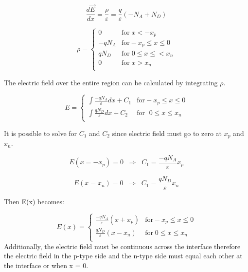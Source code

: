 \begin{doublespace}
\begin{equation}
\frac{d \vec{E} }{dx}=\frac{\rho}{\varepsilon}=\frac{q}{\varepsilon}(-N_{A}+N_{D})
\end{equation}

\begin{equation}
\rho = \begin{cases}
         0 & \text{for} \;  x<-x_{p}\\
       -qN_{A} & \text{for}  -x_{p}\leq x \leq 0 \\
        qN_{D} & \text{for} \; 0 \leq x \leq< x_{n}  \\
        0 & \text{for}\;  x>x_{n} \\
     \end{cases}
\end{equation}

The electric field over the entire region can be calculated by integrating $\rho$.

\begin{equation}
E = \begin{cases}
       \int \frac{-qN_{A}}{\varepsilon}  dx+ C_{1} & \text{for}  -x_{p}\leq x \leq 0 \\
       \int \frac{qN_{D}}{\varepsilon} dx+ C_{2}   & \text{for } \; 0 \leq x \leq x_{n}  \\
     \end{cases}
\end{equation}

It is possible to solve for $C_{1}$ and $C_{2}$ since electric field must go to zero at $x_{p}$ and $x_{n}$.

\begin{equation}
E(x=-x_{p})=0  \; \;  \Rightarrow  \;\; C_{1}= \frac{-qN_{A}}{\varepsilon}x_{p}
\end{equation}

\begin{equation}
E(x=x_{n})=0  \; \;  \Rightarrow  \;\; C_{1}= \frac{qN_{D}}{\varepsilon}x_{n}
\end{equation}

Then E(x) becomes:

\begin{equation}
E(x) = \begin{cases}
         \frac{-qN_{A}}{\varepsilon}(x+x_{p}) & \text{for}  -x_{p}\leq x \leq 0 \\
         \frac{qN_{D}}{\varepsilon}(x-x_{n})  &  \text{for} \; 0 \leq x \leq x_{n}  \\
     \end{cases}
\end{equation}
 Additionally, the electric field must be continuous across the interface therefore the electric field in the p-type side and the n-type side must equal each other at the interface or when x = 0. 


\end{doublespace}
